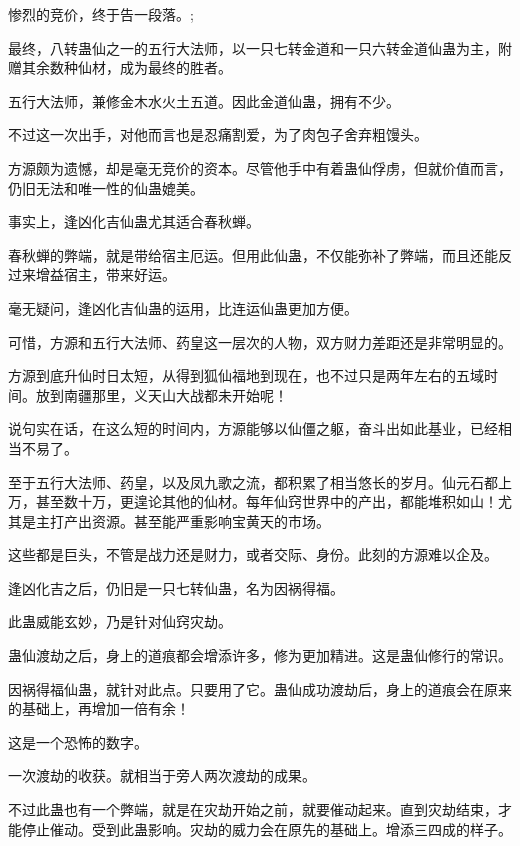 
\begin{this_body}

惨烈的竞价，终于告一段落。;

最终，八转蛊仙之一的五行大法师，以一只七转金道和一只六转金道仙蛊为主，附赠其余数种仙材，成为最终的胜者。

五行大法师，兼修金木水火土五道。因此金道仙蛊，拥有不少。

不过这一次出手，对他而言也是忍痛割爱，为了肉包子舍弃粗馒头。

方源颇为遗憾，却是毫无竞价的资本。尽管他手中有着蛊仙俘虏，但就价值而言，仍旧无法和唯一性的仙蛊媲美。

事实上，逢凶化吉仙蛊尤其适合春秋蝉。

春秋蝉的弊端，就是带给宿主厄运。但用此仙蛊，不仅能弥补了弊端，而且还能反过来增益宿主，带来好运。

毫无疑问，逢凶化吉仙蛊的运用，比连运仙蛊更加方便。

可惜，方源和五行大法师、药皇这一层次的人物，双方财力差距还是非常明显的。

方源到底升仙时日太短，从得到狐仙福地到现在，也不过只是两年左右的五域时间。放到南疆那里，义天山大战都未开始呢！

说句实在话，在这么短的时间内，方源能够以仙僵之躯，奋斗出如此基业，已经相当不易了。

至于五行大法师、药皇，以及凤九歌之流，都积累了相当悠长的岁月。仙元石都上万，甚至数十万，更遑论其他的仙材。每年仙窍世界中的产出，都能堆积如山！尤其是主打产出资源。甚至能严重影响宝黄天的市场。

这些都是巨头，不管是战力还是财力，或者交际、身份。此刻的方源难以企及。

逢凶化吉之后，仍旧是一只七转仙蛊，名为因祸得福。

此蛊威能玄妙，乃是针对仙窍灾劫。

蛊仙渡劫之后，身上的道痕都会增添许多，修为更加精进。这是蛊仙修行的常识。

因祸得福仙蛊，就针对此点。只要用了它。蛊仙成功渡劫后，身上的道痕会在原来的基础上，再增加一倍有余！

这是一个恐怖的数字。

一次渡劫的收获。就相当于旁人两次渡劫的成果。

不过此蛊也有一个弊端，就是在灾劫开始之前，就要催动起来。直到灾劫结束，才能停止催动。受到此蛊影响。灾劫的威力会在原先的基础上。增添三四成的样子。


\end{this_body}

